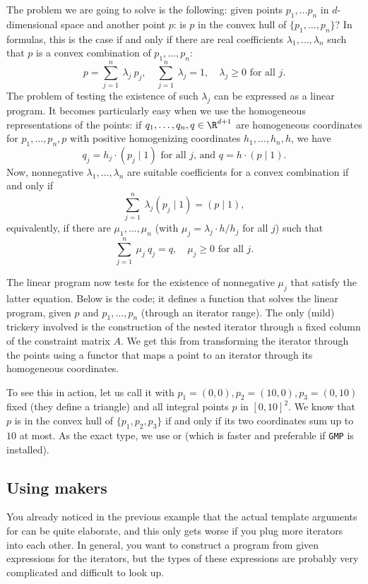 The problem we are going to solve is the following: given points
$p_1,\ldots p_{n}$ in $d$-dimensional space and another point $p$: is
$p$ in the convex hull of $\{p_1,\ldots,p_{n}\}$? In formulas, this is
the case if and only if there are real coefficients
$\lambda_1,\ldots,\lambda_n$ such that $p$ is a convex combination of
$p_1,\ldots,p_n$: 
\[
p = \sum_{j=1}^{n}~\lambda_j~p_j, \quad \sum_{j=1}^{n}~\lambda_j = 1,
\quad \lambda_j \geq 0 \mbox{~for all $j$.}
\]
The problem of testing the existence of such $\lambda_j$ can 
be expressed as a linear program. It becomes particularly easy
when we use the homogeneous representations of the points: if
$q_1,\ldots,q_n,q\in\R^{d+1}$ are homogeneous coordinates for
$p_1,\ldots,p_n,p$ with positive homogenizing coordinates 
$h_1,\ldots,h_n,h$, we have
\[q_j = h_j \cdot (p_j \mid 1) \mbox{~for all $j$, and~} q = h \cdot
(p\mid 1).\] Now, nonnegative $\lambda_1,\ldots,\lambda_n$ are
suitable coefficients for a convex combination if and only if
\[\sum_{j=1}^n~ \lambda_j(p_j \mid 1) = (p\mid 1), \]
equivalently, if there are $\mu_1,\ldots,\mu_n$ 
(with $\mu_j = \lambda_j \cdot h/{h_j}$ for all $j$) such that
\[
\sum_{j=1}^n~\mu_j~q_j = q, \quad \mu_j \geq 0\mbox{~for all $j$}.
\]

The linear program now tests for the existence of nonnegative $\mu_j$
that satisfy the latter equation. Below is the code; it defines a
function that solves the linear program, given $p$ and
$p_1,\ldots,p_n$ (through an iterator range). The only (mild)
trickery involved is the construction of the nested iterator 
through a fixed column of the constraint matrix $A$. We get this
from transforming the iterator through the points using a functor 
that maps a point to an iterator through its homogeneous coordinates.


To see this in action, let us call it with $p_1=(0,0), p_2=(10,0),
p_3=(0,10)$ fixed (they define a triangle) and all integral points $p$
in $[0,10]^2$. We know that $p$ is in the convex hull of
$\{p_1,p_2,p_3\}$ if and only if its two coordinates sum up to $10$ at
most. As the exact type, we use  or  
(which is faster and preferable if \texttt{GMP} is installed).


\subsection{Using makers\label{sec:QP-makers}}
You already noticed in the previous example that the actual 
template arguments for 
can be quite elaborate, and this only gets worse if you plug more 
iterators into each other. In general, you want to construct a 
program from given expressions for the iterators, but the
types of these expressions are probably very complicated and 
difficult to look up. 

